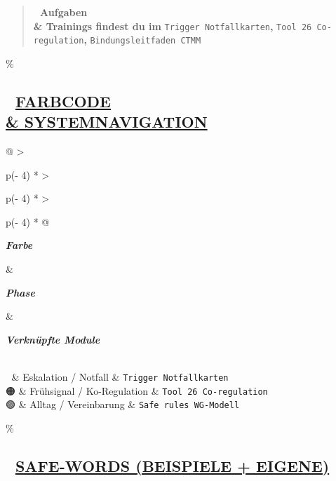 \begin{quote}
\textbf{📎 Aufgaben \\& Trainings findest du im} \texttt{T}\texttt{rigger}\texttt{\ }\texttt{N}\texttt{otfallkarten}\textbf{,} \texttt{T}\texttt{ool}\texttt{\ }\texttt{26}\texttt{\ C}\texttt{o}\texttt{-}\texttt{regulation}\textbf{,} \texttt{B}\texttt{indungsleitfaden}\texttt{\ CTMM}
\end{quote}

\hypertarget{farbcode-systemnavigation}{\%
\subsection{\texorpdfstring{🎨 \textbf{\ul{FARBCODE \\& SYSTEMNAVIGATION}}}{🎨 FARBCODE \\& SYSTEMNAVIGATION}}\label{farbcode-systemnavigation}}

\begin{longtable}[]{@{}
  >{\raggedright\arraybackslash}p{(\columnwidth - 4\tabcolsep) * }
  >{\raggedright\arraybackslash}p{(\columnwidth - 4\tabcolsep) * }
  >{\raggedright\arraybackslash}p{(\columnwidth - 4\tabcolsep) * }@{}}
\toprule\noalign{}
\begin{minipage}[b]{\linewidth}\raggedright
\emph{\textbf{Farbe}}
\end{minipage} \& \begin{minipage}[b]{\linewidth}\raggedright
\emph{\textbf{Phase}}
\end{minipage} \& \begin{minipage}[b]{\linewidth}\raggedright
\emph{\textbf{Verknüpfte Module}}
\end{minipage} \\
\midrule\noalign{}
\endhead
\bottomrule\noalign{}
\endlastfoot
🔴 \& Eskalation / Notfall \& \texttt{T}\texttt{rigger}\texttt{\ }\texttt{N}\texttt{otfallkarten} \\
🟠 \& Frühsignal / Ko-Regulation \& \texttt{T}\texttt{ool}\texttt{\ }\texttt{26}\texttt{\ C}\texttt{o}\texttt{-}\texttt{regulation} \\
🟢 \& Alltag / Vereinbarung \& \texttt{S}\texttt{afe}\texttt{\ }\texttt{rules}\texttt{\ WG-M}\texttt{odell} \\
\end{longtable}

\hypertarget{safe-words-beispiele-eigene}{\%
\subsection{\texorpdfstring{🔑 \textbf{\ul{SAFE-WORDS (BEISPIELE + EIGENE)}}}{🔑 SAFE-WORDS (BEISPIELE + EIGENE)}}\label{safe-words-beispiele-eigene}}

